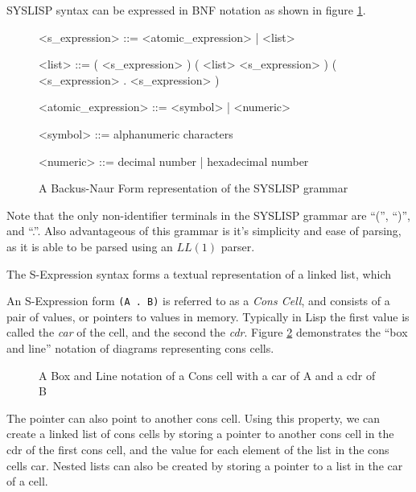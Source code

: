\documentclass[10pt]{report}
\begin{document}
SYSLISP syntax can be expressed in BNF notation as shown in figure \ref{fig:bnf}.

\begin{figure}[h!]
  \centering
  \begin{grammar}
    <s_expression> ::= <atomic_expression> | <list>
    
    <list> ::= ( <s_expression> )
    \alt ( <list> <s_expression> )
    \alt ( <s_expression> . <s_expression> )
    
    <atomic_expression> ::= <symbol> | <numeric>
    
    <symbol> ::= alphanumeric characters
    
    <numeric> ::= decimal number | hexadecimal number
  \end{grammar}
  \caption{A Backus-Naur Form representation of the SYSLISP grammar}
  \label{fig:bnf}
\end{figure}

\newpage

Note that the only non-identifier terminals in the SYSLISP grammar are ``('', ``)'', and ``.''. Also advantageous of this grammar is it's simplicity and ease of parsing, as it is able to be parsed using an $LL(1)$ parser.

The S-Expression syntax forms a textual representation of a linked list, which 

An S-Expression form \texttt{(A . B)} is referred to as a \textit{Cons Cell}, and consists of a pair of values, or pointers to values in memory. Typically in Lisp the first value is called the \textit{car} of the cell, and the second the \textit{cdr}. Figure \ref{fig:cons} demonstrates the ``box and line'' notation of diagrams representing cons cells.

\begin{figure}[h]
  \centering
  \caption{A Box and Line notation of a Cons cell with a car of A and a cdr of B}
  \label{fig:cons}
\end{figure}

The pointer can also point to another cons cell. Using this property, we can create a linked list of cons cells by storing a pointer to another cons cell in the cdr of the first cons cell, and the value for each element of the list in the cons cells car. Nested lists can also be created by storing a pointer to a list in the car of a cell.
\end{document}
